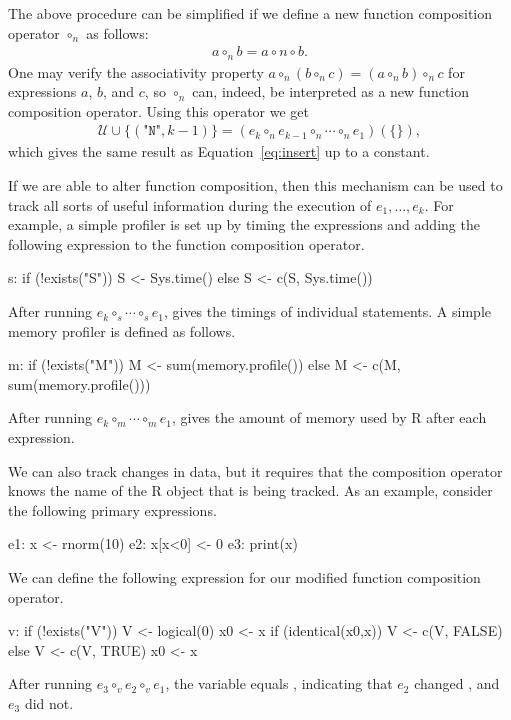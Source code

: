 The above procedure can be simplified if we define a new function composition
operator $\circ_n$ as follows:
\begin{align*}
a\circ_n b = a\circ n \circ b.
\end{align*}
One may verify  the associativity property $a\circ_n(b\circ_n c)=(a\circ_n
b)\circ_n c$ for expressions $a$, $b$, and $c$, so $\circ_n$ can, indeed, be
interpreted as a new function composition operator. Using this operator we get
\begin{align}
\mathcal{U}\cup\{(\texttt{"N"},k-1)\} = (e_k\circ_n e_{k-1}\circ_n \cdots\circ_n e_1)(\{\}),
\label{eq:compose}
\end{align}
which gives the same result as Equation~\ref{eq:insert} up to a constant.

If we are able to alter function composition, then this mechanism can be used
to track all sorts of useful information during the execution of $e_1,\ldots,
e_k$.  For example, a simple profiler is set up by timing the expressions and
adding the following expression to the function composition operator.
\begin{example}
  s: if (!exists("S")) S <- Sys.time() else S <- c(S, Sys.time())
\end{example} 
After running $e_k\circ_s\cdots\circ_s e_1$,   gives the timings of
individual statements. A simple memory profiler is defined as follows.
\begin{example}
  m: if (!exists("M")) M <- sum(memory.profile()) else M <- c(M, sum(memory.profile()))
\end{example}
After running  $e_k\circ_m\cdots\circ_m e_1$,  gives the amount of memory
used by R after each expression.

We can also track changes in data, but it requires that the composition
operator knows the name of the R object that is being tracked.
As an example, consider the following primary expressions.
\begin{example}
  e1:  x <- rnorm(10)
  e2:  x[x<0] <- 0
  e3:  print(x)
\end{example}
We can define the following expression for our modified function composition
operator.
\begin{example}
  v:  {
        if (!exists("V")){ 
          V <- logical(0)
          x0 <- x
        }
        if (identical(x0,x)) V <- c(V, FALSE)
        else V <- c(V, TRUE)
        x0 <- x
      }
\end{example}
After running $e_3\circ_v e_2\circ_v e_1$, the variable  equals
, indicating that $e_2$ changed , and $e_3$ did
not.


